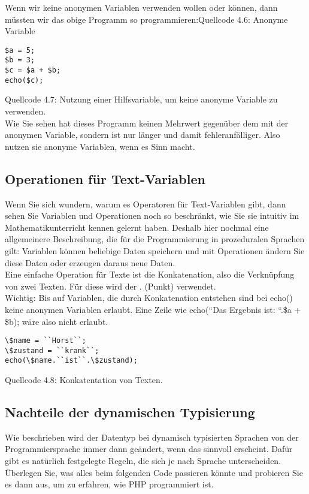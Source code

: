 Wenn wir keine anonymen Variablen verwenden wollen oder können, dann müssten wir das obige Programm so programmieren:Quellcode 4.6: Anonyme Variable

\begin{verbatim}
$a = 5;
$b = 3;
$c = $a + $b;
echo($c);
\end{verbatim}
Quellcode 4.7: Nutzung einer Hilfsvariable, um keine anonyme Variable zu verwenden.\\

Wie Sie sehen hat dieses Programm keinen Mehrwert gegenüber dem mit der anonymen Variable, sondern ist nur länger und damit fehleranfälliger. Also nutzen sie anonyme Variablen, wenn es Sinn macht.

\subsection{Operationen für Text-Variablen}

Wenn Sie sich wundern, warum es Operatoren für Text-Variablen gibt, dann sehen Sie Variablen und Operationen noch so beschränkt, wie Sie sie intuitiv im Mathematikunterricht kennen gelernt haben. Deshalb hier nochmal eine allgemeinere Beschreibung, die für die Programmierung in prozeduralen Sprachen gilt: Variablen können beliebige Daten speichern und mit Operationen ändern Sie diese Daten oder erzeugen daraus neue Daten.\\

Eine einfache Operation für Texte ist die Konkatenation, also die Verknüpfung von zwei Texten. Für diese wird der . (Punkt) verwendet.\\

Wichtig: Bis auf Variablen, die durch Konkatenation entstehen sind bei echo() keine anonymen Variablen erlaubt. Eine Zeile wie echo(``Das Ergebnis ist: ``.\$a + \$b); wäre also nicht erlaubt.\\

\begin{verbatim}
\$name = ``Horst``;
\$zustand = ``krank``;
echo(\$name.``ist``.\$zustand);
\end{verbatim}
Quellcode 4.8: Konkatentation von Texten.

\subsection{Nachteile der dynamischen Typisierung}

Wie beschrieben wird der Datentyp bei dynamisch typisierten Sprachen von der Programmiersprache immer dann geändert, wenn das sinnvoll erscheint. Dafür gibt es natürlich festgelegte Regeln, die sich je nach Sprache unterscheiden. Überlegen Sie, was alles beim folgenden Code passieren könnte und probieren Sie es dann aus, um zu erfahren, wie PHP programmiert ist.\\

